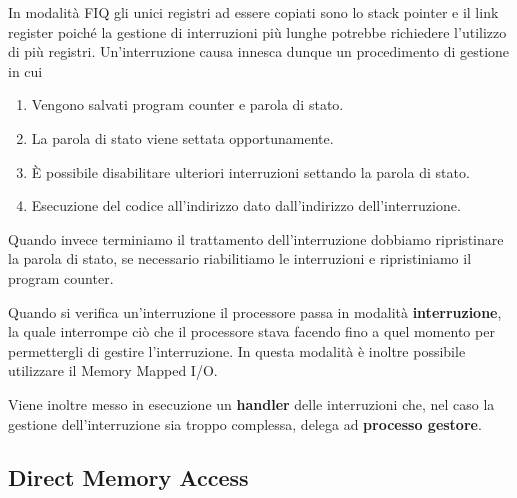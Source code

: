 In modalità FIQ gli unici registri ad essere copiati sono lo stack pointer e il link register
poiché la gestione di interruzioni più lunghe potrebbe richiedere l'utilizzo di più registri.
Un'interruzione causa innesca dunque un procedimento di gestione in cui
\begin{enumerate}
	\item Vengono salvati program counter e parola di stato.
	\item La parola di stato viene settata opportunamente.
	\item \`E possibile disabilitare ulteriori interruzioni settando la parola di stato.
	\item Esecuzione del codice all'indirizzo dato dall'indirizzo dell'interruzione.
\end{enumerate}
Quando invece terminiamo il trattamento dell'interruzione dobbiamo ripristinare la parola di stato,
se necessario riabilitiamo le interruzioni e ripristiniamo il program counter.

Quando si verifica un'interruzione il processore passa in modalità \textbf{interruzione}, la quale
interrompe ciò che il processore stava facendo fino a quel momento per permettergli di gestire
l'interruzione. In questa modalità è inoltre possibile utilizzare il Memory Mapped I/O.

Viene inoltre messo in esecuzione un \textbf{handler} delle interruzioni che, nel caso la gestione
dell'interruzione sia troppo complessa, delega ad \textbf{processo gestore}.

\subsection{Direct Memory Access}
